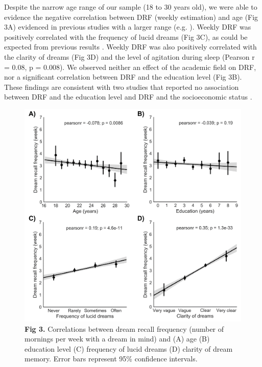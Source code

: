 Despite the narrow age range of our sample (18 to 30 years old), we were able to evidence the negative correlation between DRF (weekly estimation) and age (Fig 3A) evidenced in previous studies with a larger range (e.g. \citealp{schredl_dream_2008}). Weekly DRF was positively correlated with the frequency of lucid dreams (Fig 3C), as could be expected from previous results \citep{stepansky_austrian_1998, schredl_lucid_2004, schredl_frequency_2011}. Weekly DRF was also positively correlated with the clarity of dreams (Fig 3D) and the level of agitation during sleep (Pearson r = 0.08, p = 0.008). We observed neither an effect of the academic field on DRF, nor a significant correlation between DRF and the education level (Fig 3B). These findings are consistent with two studies that reported no association between DRF and the education level and DRF and the socioeconomic status \citep{schredl_dream_2007, schredl_dream_2008}.

\begin{figure}[htbp]
	\includegraphics[width=\textwidth]{Fig/Results/Survey/Fig3.png}
	\caption*{\textbf{Fig 3.} Correlations between dream recall frequency (number of mornings per week with a dream in mind) and (A) age (B) education level (C) frequency of lucid dreams (D) clarity of dream memory. Error bars represent 95\% confidence intervals.}
\end{figure}

